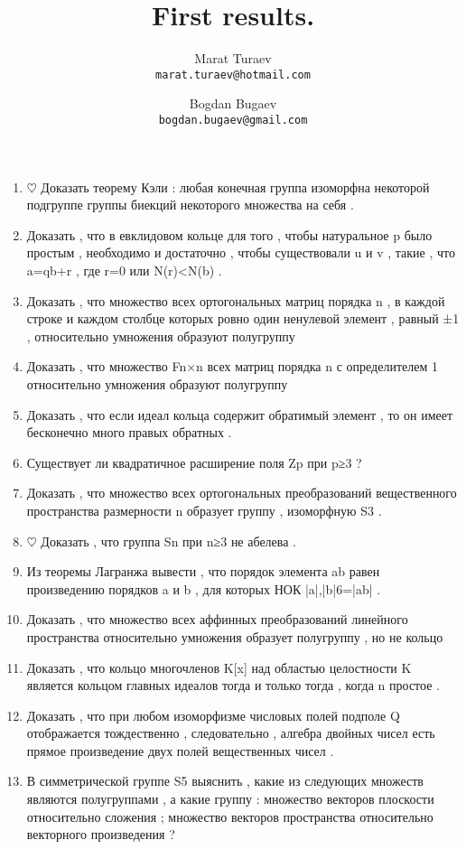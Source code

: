 \documentclass[10pt]{article}
\author{
	Marat Turaev\\
	\texttt{marat.turaev@hotmail.com}
	\and
	Bogdan Bugaev\\
	\texttt{bogdan.bugaev@gmail.com}
}
\begin{document}
\title{First results.}
\maketitle

\begin{enumerate}[1.]
	\item $\heartsuit$ Доказать теорему Кэли : любая конечная группа изоморфна некоторой подгруппе группы биекций некоторого множества на себя .
	\item Доказать , что в евклидовом кольце для того , чтобы натуральное p было простым , необходимо и достаточно , чтобы существовали u и v , такие , что a=qb+r , где r=0 или N(r)<N(b) .
	\item Доказать , что множество всех ортогональных матриц порядка n , в каждой строке и каждом столбце которых ровно один ненулевой элемент , равный ±1 , относительно умножения образуют полугруппу
	\item Доказать , что множество Fn×n всех матриц порядка n с определителем 1 относительно умножения образуют полугруппу
	\item Доказать , что если идеал кольца содержит обратимый элемент , то он имеет бесконечно много правых обратных .
	\item Существует ли квадратичное расширение поля Zp при p≥3 ?
	\item Доказать , что множество всех ортогональных преобразований вещественного пространства размерности n образует группу , изоморфную S3 .
	\item $\heartsuit$ Доказать , что группа Sn при n≥3 не абелева .
	\item Из теоремы Лагранжа вывести , что порядок элемента ab равен произведению порядков a и b , для которых НОК {|a|,|b|}6=|ab| .
	\item Доказать , что множество всех аффинных преобразований линейного пространства относительно умножения образует полугруппу , но не кольцо
	\item Доказать , что кольцо многочленов K[x] над областью целостности K является кольцом главных идеалов тогда и только тогда , когда n простое .
	\item Доказать , что при любом изоморфизме числовых полей подполе Q отображается тождественно , следовательно , алгебра двойных чисел есть прямое произведение двух полей вещественных чисел .
	\item В симметрической группе S5 выяснить , какие из следующих множеств являются полугруппами , а какие группу : множество векторов плоскости относительно сложения ; множество векторов пространства относительно векторного произведения ? 
\end{enumerate}
\end{document}
